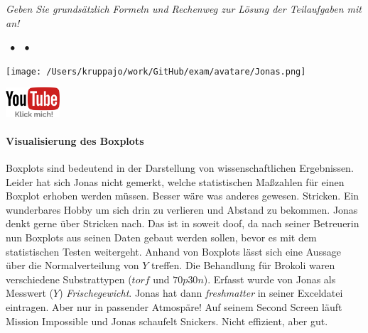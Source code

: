 \documentclass[a4paper, 9pt]{scrartcl}\usepackage[]{graphicx}\usepackage[]{xcolor}
\begin{document}
\textit{Geben Sie grundsätzlich Formeln und Rechenweg zur Lösung der Teilaufgaben mit an!} \\[1Ex]
 

 
\ifcollection
\begin{flushright}
\tiny\vspace{-3Ex}
\textbf{\examinhaltstart}
\exammodulemathstat $\;\bullet$
\exammodulestat $\;\bullet$
\exammodulestatbbv 
\vspace{-4Ex}
\end{flushright}
\begin{minipage}[t]{0.5\textwidth}
\texttt{[image: /Users/kruppajo/work/GitHub/exam/avatare/Jonas.png]}
\end{minipage}
\begin{minipage}[t]{0.5\textwidth}
\hfill
\href{https://youtu.be/0xc0jIPeiyw}{\includegraphics[width = 2cm]{img/youtube}}
\end{minipage}
\vspace{-3ex}
\fi



\ifcollection
\paragraph{Visualisierung des Boxplots}
\fi

Boxplots sind bedeutend in der Darstellung von wissenschaftlichen Ergebnissen. Leider hat sich Jonas nicht gemerkt, welche statistischen Maßzahlen für einen Boxplot erhoben werden müssen. Besser wäre was anderes gewesen. Stricken. Ein wunderbares Hobby um sich drin zu verlieren und Abstand zu bekommen. Jonas denkt gerne über Stricken nach. Das ist in soweit doof, da nach seiner Betreuerin nun Boxplots aus seinen Daten gebaut werden sollen, bevor es mit dem statistischen Testen weitergeht. Anhand von Boxplots lässt sich eine Aussage über die Normalverteilung von $Y$ treffen. Die Behandlung für Brokoli waren verschiedene Substrattypen ($torf$ und $70p30n$). Erfasst wurde von Jonas als Messwert ($Y$) \textit{Frischegewicht}. Jonas hat dann \textit{freshmatter} in seiner Exceldatei eintragen. Aber nur in passender Atmospäre! Auf seinem Second Screen läuft Mission Impossible und Jonas schaufelt Snickers. Nicht effizient, aber gut.
\end{document}
